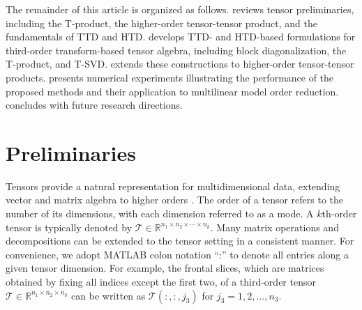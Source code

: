 \documentclass[onefignum,onetabnum]{siamart250211}
\begin{document}
The remainder of this article is organized as follows.  reviews tensor preliminaries, including the T-product, the higher-order tensor-tensor product, and the fundamentals of TTD and HTD.  develops TTD- and HTD-based formulations for third-order transform-based tensor algebra, including block diagonalization, the T-product, and T-SVD.  extends these constructions to higher-order tensor-tensor products.  presents numerical experiments illustrating the performance of the proposed methods and their application to multilinear  model order reduction.  concludes with future research directions.

\section{Preliminaries} \label{sec:preliminaries}
Tensors provide a natural representation for multidimensional data, extending vector and matrix algebra to higher orders \cite{chen2024tpds,kolda2009tensor}. The order of a tensor refers to the number of its dimensions, with each dimension referred to as a mode. A $k$th-order tensor is typically denoted by $\mathscr{T} \in \mathbb{R}^{n_1 \times n_2 \times \cdots \times n_k}$. Many matrix operations and decompositions can be extended to the tensor setting in a consistent manner. For convenience, we adopt MATLAB colon notation “:” to denote all entries along a given tensor dimension. For example, the frontal slices, which are matrices obtained by fixing all indices except the first two, of a third-order tensor $\mathscr{T}\in\mathbb{R}^{n_1\times n_2\times n_3}$ can be written as $\mathscr{T}(:,:,j_3)$ for $j_3=1,2,\dots,n_3$.
\end{document}

